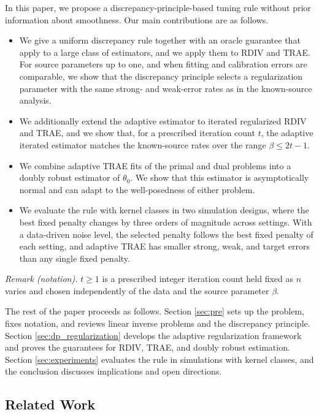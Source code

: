 \documentclass[12pt]{article}
\theoremstyle{plain}
\theoremstyle{definition}
\theoremstyle{remark}
\begin{document}
In this paper, we propose a discrepancy-principle-based tuning rule without prior information about smoothness. Our main contributions are as follows.
\begin{itemize}
    \item We give a uniform discrepancy rule together with an oracle guarantee that apply to a large class of estimators, and we apply them to RDIV and TRAE. For source parameters up to one, and when fitting and calibration errors are comparable, we show that the discrepancy principle selects a regularization parameter with the same strong- and weak-error rates as in the known-source analysis.
    \item We additionally extend the adaptive estimator to iterated regularized RDIV and TRAE, and we show that, for a prescribed iteration count $t$, the adaptive iterated estimator matches the known-source rates over the range $\beta\leqslant2t-1$.
    \item We combine adaptive TRAE fits of the primal and dual problems into a doubly robust estimator of $\theta_0$. We show that this estimator is asymptotically normal and can adapt to the well-posedness of either problem.
    \item We evaluate the rule with kernel classes in two simulation designs, where the best fixed penalty changes by three orders of magnitude across settings. With a data-driven noise level, the selected penalty follows the best fixed penalty of each setting, and adaptive TRAE has smaller strong, weak, and target errors than any single fixed penalty.
\end{itemize}

\noindent\textit{Remark (notation).} $t\geqslant1$ is a prescribed integer iteration count held fixed as $n$ varies and chosen independently of the data and the source parameter $\beta$.


The rest of the paper proceeds as follows. Section \ref{sec:pre} sets up the problem, fixes notation, and reviews linear inverse problems and the discrepancy principle. Section \ref{sec:dp_regularization} develops the adaptive regularization framework and proves the guarantees for RDIV, TRAE, and doubly robust estimation. Section \ref{sec:experiments} evaluates the rule in simulations with kernel classes, and the conclusion discusses implications and open directions.



\subsection{Related Work}
\end{document}
